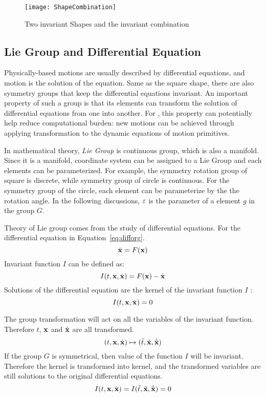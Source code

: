 \begin{figure}[!htbp]
  \begin{center}
    \texttt{[image: ShapeCombination]}
    \caption{Two invariant Shapes and the invariant combination}
    \label{fig:SymmetrySpace}
\end{center}
\end{figure}

\subsection{Lie Group and Differential Equation}
Physically-based motions are usually described by differential equations, and motion is the solution of the equation.
Same as the square shape, there are also symmetry groups that keep the differential equations invariant.
An important property of such a group  is that its elements can transform the solution of differential equations from one into another\citep{olver1986applications}.
For \cms, this property  can potentially help reduce computational burden: new motions can be achieved through applying  transformation to the dynamic equations of motion primitives.




In mathematical theory, \emph{Lie Group} is continuous group, which is also a manifold.
Since it is a manifold, coordinate system can be assigned to a Lie Group and each elements can be parameterized.
For example, the symmetry rotation group of square is discrete, while symmetry group of circle is continuous.
For the symmetry group of the circle, each element can be parameterize by the the rotation angle.
In the following discussions,  $\varepsilon$ is the parameter of a element $g$ in the group $G$.

Theory of Lie group comes from the study of differential equations.
For the differential equation in Equation~\ref{eq:difforg}.
\begin{equation}
\label{eq:difforg}
\dot{\mathbf{x}}=F(\mathbf{x})
\end{equation}
Invariant function $I$ can be defined as:
\[
I(t,\mathbf{x},\dot{\mathbf{x}})=F(\mathbf{x})-\dot{\mathbf{x}}
\]
Solutions of the differential equation are the kernel of the invariant function $I$ :
 \[
 I(t,\mathbf{x},\dot{\mathbf{x}})=0
 \]
 
 
The group transformation will act on all the variables of the invariant function.
Therefore $t$, $\mathbf{x}$ and $\dot{\mathbf{x}}$ are all transformed.
\[
(t,\mathbf{x},\dot{\mathbf{x}}) \mapsto (\tilde{t},\tilde{\mathbf{x}},\dot{\tilde{\mathbf{x}}})
\]
If the group $G$ is symmetrical, then value of the  function $I$ will be invariant.
Therefore  the kernel is transformed into kernel, and the transformed variables are still solutions to the original differential equations. 
\[
I(t,\mathbf{x},\dot{\mathbf{x}})=I(\tilde{t},\tilde{\mathbf{x}},\dot{\tilde{\mathbf{x}}})=0
\]


